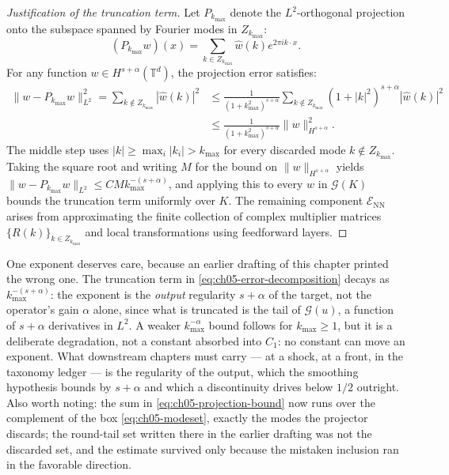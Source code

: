 \begin{proof}[Justification of the truncation term]
Let $P_{k_{\max}}$ denote the $L^2$-orthogonal projection onto the subspace spanned by Fourier modes in $Z_{k_{\max}}$:
\begin{equation}
  \label{eq:ch05-projection}
  (P_{k_{\max}} w)(x) = \sum_{k \in Z_{k_{\max}}} \hat{w}(k) e^{2\pi i k \cdot x}.
\end{equation}
For any function $w \in H^{s+\alpha}(\mathbb{T}^d)$, the projection error satisfies:
\begin{equation}
  \label{eq:ch05-projection-bound}
  \begin{aligned}
    \|w - P_{k_{\max}} w\|_{L^2}^2 = \sum_{k \notin Z_{k_{\max}}} |\hat{w}(k)|^2
    &\le \frac{1}{(1 + k_{\max}^2)^{s+\alpha}} \sum_{k \notin Z_{k_{\max}}} (1 + |k|^2)^{s+\alpha} |\hat{w}(k)|^2 \\
    &\le \frac{1}{(1 + k_{\max}^2)^{s+\alpha}} \|w\|_{H^{s+\alpha}}^2.
  \end{aligned}
\end{equation}
The middle step uses $|k| \ge \max_i |k_i| > k_{\max}$ for every discarded mode $k \notin Z_{k_{\max}}$.
Taking the square root and writing $M$ for the bound on $\|w\|_{H^{s+\alpha}}$ yields $\|w - P_{k_{\max}} w\|_{L^2} \le C M k_{\max}^{-(s+\alpha)}$, and applying this to every $w$ in $\mathcal{G}(K)$ bounds the truncation term uniformly over $K$. The remaining component $\mathcal{E}_{\text{NN}}$ arises from approximating the finite collection of complex multiplier matrices $\{R(k)\}_{k \in Z_{k_{\max}}}$ and local transformations using feedforward layers.
\end{proof}

One exponent deserves care, because an earlier drafting of this chapter
printed the wrong one. The truncation term in
\eqref{eq:ch05-error-decomposition} decays as $k_{\max}^{-(s+\alpha)}$: the
exponent is the \emph{output} regularity $s + \alpha$ of the target, not the
operator's gain $\alpha$ alone, since what is truncated is the tail of
$\mathcal{G}(u)$, a function of $s+\alpha$ derivatives in $L^2$. A weaker
$k_{\max}^{-\alpha}$ bound follows for $k_{\max} \ge 1$, but it is a deliberate
degradation, not a constant absorbed into $C_1$: no constant can move an
exponent. What downstream chapters must carry --- at a shock, at a front, in
the taxonomy ledger --- is the regularity of the output, which the smoothing
hypothesis bounds by $s + \alpha$ and which a discontinuity drives below $1/2$
outright. Also worth noting: the sum in \eqref{eq:ch05-projection-bound} now
runs over the complement of the box \eqref{eq:ch05-modeset}, exactly the modes
the projector discards; the round-tail set written there in the earlier drafting
was not the discarded set, and the estimate survived only because the mistaken
inclusion ran in the favorable direction.

